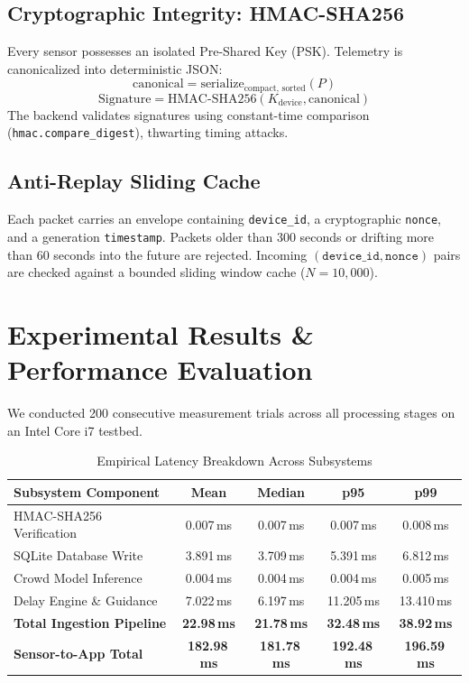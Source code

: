 \documentclass[conference]{IEEEtran}
\begin{document}
\subsection{Cryptographic Integrity: HMAC-SHA256}
Every sensor possesses an isolated Pre-Shared Key (PSK). Telemetry is canonicalized into deterministic JSON:
\begin{equation}
\text{canonical} = \text{serialize}_{\text{compact, sorted}}(P)
\end{equation}
\begin{equation}
\text{Signature} = \text{HMAC-SHA256}(K_{\text{device}}, \text{canonical})
\end{equation}
The backend validates signatures using constant-time comparison (\texttt{hmac.compare\_digest}), thwarting timing attacks.

\subsection{Anti-Replay Sliding Cache}
Each packet carries an envelope containing \texttt{device\_id}, a cryptographic \texttt{nonce}, and a generation \texttt{timestamp}.
Packets older than 300 seconds or drifting more than 60 seconds into the future are rejected. Incoming $(\texttt{device\_id}, \texttt{nonce})$ pairs are checked against a bounded sliding window cache ($N=10,000$).

\section{Experimental Results \& Performance Evaluation}
We conducted 200 consecutive measurement trials across all processing stages on an Intel Core i7 testbed.

\begin{table}[htbp]
\caption{Empirical Latency Breakdown Across Subsystems}
\begin{center}
\begin{tabular}{lcccc}
\toprule
\textbf{Subsystem Component} & \textbf{Mean} & \textbf{Median} & \textbf{p95} & \textbf{p99} \\
\midrule
HMAC-SHA256 Verification & 0.007\,ms & 0.007\,ms & 0.007\,ms & 0.008\,ms \\
SQLite Database Write & 3.891\,ms & 3.709\,ms & 5.391\,ms & 6.812\,ms \\
Crowd Model Inference & 0.004\,ms & 0.004\,ms & 0.004\,ms & 0.005\,ms \\
Delay Engine \& Guidance & 7.022\,ms & 6.197\,ms & 11.205\,ms & 13.410\,ms \\
\textbf{Total Ingestion Pipeline} & \textbf{22.98\,ms} & \textbf{21.78\,ms} & \textbf{32.48\,ms} & \textbf{38.92\,ms} \\
\textbf{Sensor-to-App Total} & \textbf{182.98\,ms} & \textbf{181.78\,ms} & \textbf{192.48\,ms} & \textbf{196.59\,ms} \\
\bottomrule
\end{tabular}
\label{tab:latency_results}
\end{center}
\end{table}
\end{document}
